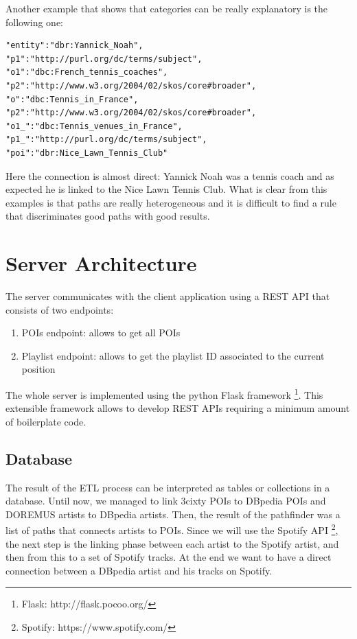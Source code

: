 \documentclass[paper=a4, fontsize=11pt]{scrartcl}
\begin{document}
Another example that shows that categories can be really explanatory is the following one:
\begin{lstlisting}
"entity":"dbr:Yannick_Noah", 
"p1":"http://purl.org/dc/terms/subject",   
"o1":"dbc:French_tennis_coaches", 
"p2":"http://www.w3.org/2004/02/skos/core#broader", 
"o":"dbc:Tennis_in_France", 
"p2":"http://www.w3.org/2004/02/skos/core#broader", 
"o1_":"dbc:Tennis_venues_in_France", 
"p1_":"http://purl.org/dc/terms/subject", 
"poi":"dbr:Nice_Lawn_Tennis_Club"
\end{lstlisting}

Here the connection is almost direct: Yannick Noah was a tennis coach and as expected he is linked to the Nice Lawn Tennis Club.
What is clear from this examples is that paths are really heterogeneous and it is difficult to find a rule that discriminates good paths with good results.

\section{Server Architecture}
The server communicates with the client application using a REST API that consists of two endpoints:
\begin{enumerate}
\item POIs endpoint: allows to get all POIs
\item Playlist endpoint: allows to get the playlist ID associated to the current position
\end{enumerate}
The whole server is implemented using the python Flask framework \footnote{Flask: http://flask.pocoo.org/}. This extensible framework allows to develop REST APIs requiring a minimum amount of boilerplate code.

\subsection{Database}
The result of the ETL process can be interpreted as tables or collections in a database.
Until now, we managed to link 3cixty POIs to DBpedia POIs and DOREMUS artists to DBpedia artists. Then, the result of the pathfinder was a list of paths that connects artists to POIs.
Since we will use the Spotify API \footnote{Spotify: https://www.spotify.com/}, the next step is the linking phase between each artist to the Spotify artist, and then from this to a set of Spotify tracks.
At the end we want to have a direct connection between a DBpedia artist and his tracks on Spotify.
\end{document}
